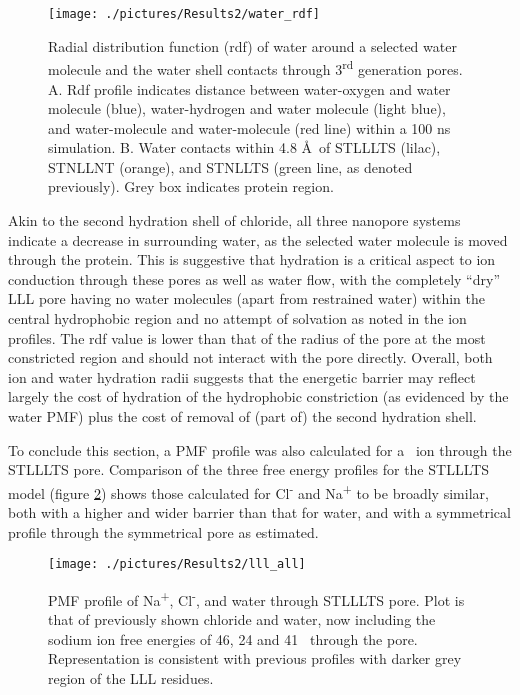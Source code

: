 \begin{figure}[H]
\begin{center}
\texttt{[image: ./pictures/Results2/water\_rdf]}
\caption[Radial distribution function (rdf) of water around a selected water molecule and the water shell contacts through 3\textsuperscript{rd} generation pores.] {Radial distribution function (rdf) of water around a selected water molecule and the water shell contacts through 3\textsuperscript{rd} generation pores. A. Rdf profile indicates distance between water-oxygen and water molecule (blue), water-hydrogen and water molecule (light blue), and water-molecule and water-molecule (red line) within a 100 ns simulation. B. Water contacts within 4.8 \AA\ of STLLLTS (lilac), STNLLNT (orange), and STNLLTS (green line, as denoted previously). Grey box indicates protein region.}  %
\label{fig:water_rdf}
\end{center}
\end{figure}

Akin to the second hydration shell of chloride, all three nanopore systems indicate a decrease in surrounding water, as the selected water molecule is moved through the protein. This is suggestive that hydration is a critical aspect to ion conduction through these pores as well as water flow, with the completely ``dry'' LLL pore having no water molecules (apart from restrained water) within the central hydrophobic region and no attempt of solvation as noted in the ion profiles. The rdf value is lower than that of the radius of the pore at the most constricted region and should not interact with the pore directly. Overall, both ion and water hydration radii suggests that the energetic barrier may reflect largely the cost of hydration of the hydrophobic constriction (as evidenced by the water PMF) plus the cost of removal of (part of) the second hydration shell. 

To conclude this section, a PMF profile was also calculated for a \Na\ ion through the STLLLTS pore. Comparison of the three free energy profiles for the STLLLTS model (figure \ref{fig:lll_all}) shows those calculated for  Cl\textsuperscript{-} and Na\textsuperscript{+} to be broadly similar, both with a higher and wider barrier than that for water, and with a symmetrical profile through the symmetrical pore as estimated.

\begin{figure}[H]
\begin{center}
\texttt{[image: ./pictures/Results2/lll\_all]}
\caption[PMF profile of Na\textsuperscript{+}, Cl\textsuperscript{-}, and water through STLLLTS pore.] {PMF profile of Na\textsuperscript{+}, Cl\textsuperscript{-}, and water through STLLLTS pore. Plot is that of previously shown chloride and water, now including the sodium ion free energies of 46, 24 and 41 \kj\ through the pore. Representation is consistent with previous profiles with darker grey region of the LLL residues. }  %
\label{fig:lll_all}
\end{center}
\end{figure}

